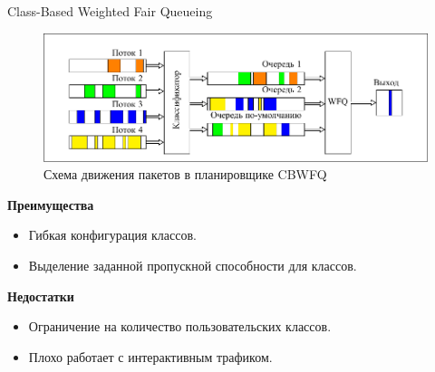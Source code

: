 \documentclass[12pt]{beamer}
\begin{document}
\begin{frame}{Class-Based Weighted Fair Queueing}
	\begin{figure}
		\center
    	\includegraphics[scale=0.7]{../text/pdfimages/cbwfq.pdf}
		\caption{Схема движения пакетов в планировщике CBWFQ}
	\end{figure}

	\begin{center}
{\footnotesize
            \begin{multicols}{2}
				{\bf Преимущества}
				\begin{itemize}
					\item Гибкая конфигурация классов.
					\item Выделение заданной пропускной способности для классов.
				\end{itemize}
            \columnbreak
				{\bf Недостатки}
				\begin{itemize}
					\item Ограничение на количество пользовательских классов.
					\item Плохо работает с интерактивным трафиком.
				\end{itemize}
            \end{multicols}
}
	\end{center}
\end{frame}
\end{document}
